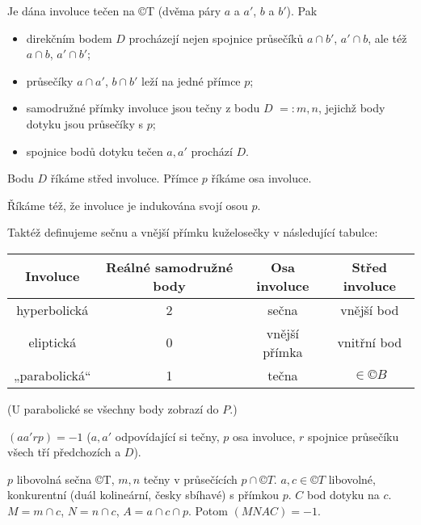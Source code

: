 \documentclass[12pt]{article}					%
\begin{document}
\begin{veta}[O involuci na ©T]
	Je dána involuce tečen na ©T (dvěma páry $a$ a $a'$, $b$ a $b'$). Pak
	\begin{itemize}
		\item direkčním bodem $D$ procházejí nejen spojnice průsečíků $a \cap b'$, $a' \cap b$, ale též $a \cap b$, $a' \cap b'$;
		\item průsečíky $a \cap a'$, $b \cap b'$ leží na jedné přímce $p$;
		\item samodružné přímky involuce jsou tečny z bodu $D$ $=: m, n$, jejichž body dotyku jsou průsečíky s $p$;
		\item spojnice bodů dotyku tečen $a, a'$ prochází $D$.
	\end{itemize}

	\begin{definicein}
		Bodu $D$ říkáme střed involuce. Přímce $p$ říkáme osa involuce.
	\end{definicein}
\end{veta}

\begin{definice}
	Říkáme též, že involuce je indukována svojí osou $p$.

	Taktéž definujeme sečnu a vnější přímku kuželosečky v následující tabulce:

	\begin{tabular}{c|ccc}
		Involuce      & Reálné samodružné body & Osa involuce  & Střed involuce \\ \hline
		hyperbolická  & 2                      & sečna         & vnější bod     \\
		eliptická     & 0                      & vnější přímka & vnitřní bod    \\
		„parabolická“ & 1                      & tečna         & $\in ©B$
	\end{tabular}

	(U parabolické se všechny body zobrazí do $P$.)
\end{definice}

\begin{dusledek}
	$(aa'rp) = -1$ ($a, a'$ odpovídající si tečny, $p$ osa involuce, $r$ spojnice průsečíku všech tří předchozích a $D$).
\end{dusledek}

\begin{veta}[D$^*$]
	$p$ libovolná sečna ©T, $m, n$ tečny v průsečících $p \cap ©T$. $a, c \in ©T$ libovolné, konkurentní (duál kolineární, česky sbíhavé) s přímkou $p$. $C$ bod dotyku na $c$. $M = m \cap c$, $N = n \cap c$, $A = a \cap c \cap p$. Potom $(MNAC) = -1$.
\end{veta}
\end{document}
